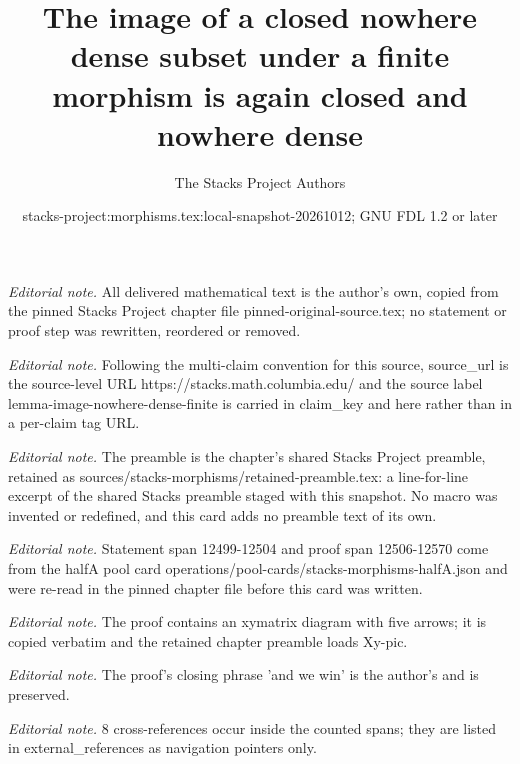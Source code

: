 \documentclass[10pt,a4paper]{amsart}
\title{The image of a closed nowhere dense subset under a finite morphism is again closed and nowhere dense}
\author{The Stacks Project Authors}
\date{stacks-project:morphisms.tex:local-snapshot-20261012; GNU FDL 1.2 or later}
\theoremstyle{plain}
\theoremstyle{definition}
\theoremstyle{remark}
\numberwithin{equation}{subsection}
\begin{document}
\maketitle
\noindent\textit{Editorial note.} All delivered mathematical text is the author's own, copied from the pinned Stacks Project chapter file pinned-original-source.tex; no statement or proof step was rewritten, reordered or removed.\par\medskip
\noindent\textit{Editorial note.} Following the multi-claim convention for this source, source\_url is the source-level URL https://stacks.math.columbia.edu/ and the source label lemma-image-nowhere-dense-finite is carried in claim\_key and here rather than in a per-claim tag URL.\par\medskip
\noindent\textit{Editorial note.} The preamble is the chapter's shared Stacks Project preamble, retained as sources/stacks-morphisms/retained-preamble.tex: a line-for-line excerpt of the shared Stacks preamble staged with this snapshot. No macro was invented or redefined, and this card adds no preamble text of its own.\par\medskip
\noindent\textit{Editorial note.} Statement span 12499-12504 and proof span 12506-12570 come from the halfA pool card operations/pool-cards/stacks-morphisms-halfA.json and were re-read in the pinned chapter file before this card was written.\par\medskip
\noindent\textit{Editorial note.} The proof contains an xymatrix diagram with five arrows; it is copied verbatim and the retained chapter preamble loads Xy-pic.\par\medskip
\noindent\textit{Editorial note.} The proof's closing phrase 'and we win' is the author's and is preserved.\par\medskip
\noindent\textit{Editorial note.} 8 cross-references occur inside the counted spans; they are listed in external\_references as navigation pointers only.\par\medskip
\end{document}
